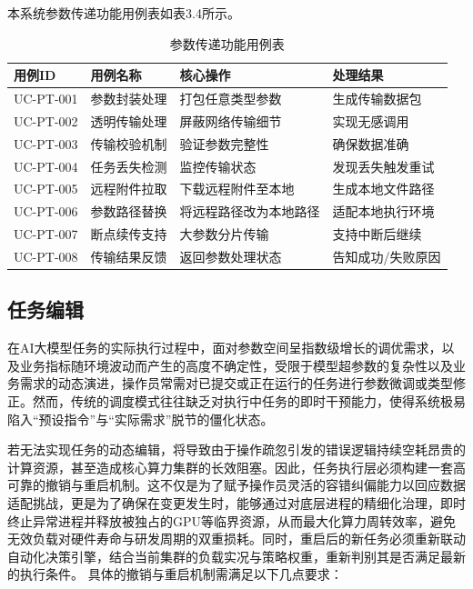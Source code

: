 本系统参数传递功能用例表如表3.4所示。

\begin{table}[htbp]
    \centering
    \caption{参数传递功能用例表}
    \begin{tabular}{llll}
        \toprule
        \textbf{用例ID} & \textbf{用例名称} & \textbf{核心操作} & \textbf{处理结果} \\
        \midrule
        UC-PT-001 & 参数封装处理 & 打包任意类型参数 & 生成传输数据包 \\
        UC-PT-002 & 透明传输处理 & 屏蔽网络传输细节 & 实现无感调用 \\
        UC-PT-003 & 传输校验机制 & 验证参数完整性 & 确保数据准确 \\
        UC-PT-004 & 任务丢失检测 & 监控传输状态 & 发现丢失触发重试 \\
        UC-PT-005 & 远程附件拉取 & 下载远程附件至本地 & 生成本地文件路径 \\
        UC-PT-006 & 参数路径替换 & 将远程路径改为本地路径 & 适配本地执行环境 \\
        UC-PT-007 & 断点续传支持 & 大参数分片传输 & 支持中断后继续 \\
        UC-PT-008 & 传输结果反馈 & 返回参数处理状态 & 告知成功/失败原因 \\
        \bottomrule
    \end{tabular}
    \label{tab:parameter_transfer_cases}
\end{table}

\subsection{任务编辑}

在AI大模型任务的实际执行过程中，面对参数空间呈指数级增长的调优需求，以及业务指标随环境波动而产生的高度不确定性，受限于模型超参数的复杂性以及业务需求的动态演进，操作员常需对已提交或正在运行的任务进行参数微调或类型修正。然而，传统的调度模式往往缺乏对执行中任务的即时干预能力，使得系统极易陷入“预设指令”与“实际需求”脱节的僵化状态。

若无法实现任务的动态编辑，将导致由于操作疏忽引发的错误逻辑持续空耗昂贵的计算资源，甚至造成核心算力集群的长效阻塞。因此，任务执行层必须构建一套高可靠的撤销与重启机制。这不仅是为了赋予操作员灵活的容错纠偏能力以回应数据适配挑战，更是为了确保在变更发生时，能够通过对底层进程的精细化治理，即时终止异常进程并释放被独占的GPU等临界资源，从而最大化算力周转效率，避免无效负载对硬件寿命与研发周期的双重损耗。同时，重启后的新任务必须重新联动自动化决策引擎，结合当前集群的负载实况与策略权重，重新判别其是否满足最新的执行条件。
具体的撤销与重启机制需满足以下几点要求：

